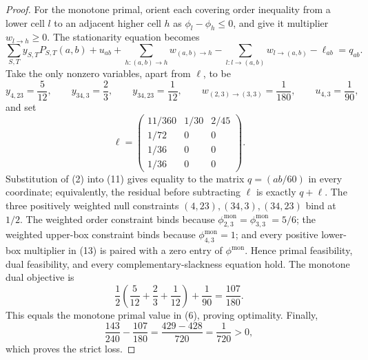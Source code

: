 \documentclass{article}
\begin{document}
\begin{proof}
For the monotone primal, orient each covering order inequality from a lower cell \(l\) to an adjacent higher cell \(h\) as \(\phi_l-\phi_h\leq0\), and give it multiplier \(w_{l\to h}\geq0\). The stationarity equation becomes
\[
 \sum_{S,T}y_{S,T}P_{S,T}(a,b)+u_{ab}
 +\sum_{h:(a,b)\to h}w_{(a,b)\to h}
 -\sum_{l:l\to(a,b)}w_{l\to(a,b)}-\ell_{ab}=q_{ab}. \tag{11}
\]
Take the only nonzero variables, apart from \(\ell\), to be
\[
 y_{4,23}=\frac5{12},\qquad y_{34,3}=\frac23,\qquad
 y_{34,23}=\frac1{12},\qquad
 w_{(2,3)\to(3,3)}=\frac1{180},\qquad
 u_{4,3}=\frac1{90}, \tag{12}
\]
and set
\[
 \ell=\begin{pmatrix}
 11/360&1/30&2/45\\
 1/72&0&0\\
 1/36&0&0\\
 1/36&0&0
 \end{pmatrix}. \tag{13}
\]
Substitution of (2) into (11) gives equality to the matrix \(q=(ab/60)\) in every coordinate; equivalently, the residual before subtracting \(\ell\) is exactly \(q+\ell\). The three positively weighted null constraints \((4,23),(34,3),(34,23)\) bind at \(1/2\). The weighted order constraint binds because \(\phi^{\mathrm{mon}}_{2,3}=\phi^{\mathrm{mon}}_{3,3}=5/6\); the weighted upper-box constraint binds because \(\phi^{\mathrm{mon}}_{4,3}=1\); and every positive lower-box multiplier in (13) is paired with a zero entry of \(\phi^{\mathrm{mon}}\). Hence primal feasibility, dual feasibility, and every complementary-slackness equation hold. The monotone dual objective is
\[
 \frac12\left(\frac5{12}+\frac23+\frac1{12}\right)+\frac1{90}
 =\frac{107}{180}. \tag{14}
\]
This equals the monotone primal value in (6), proving optimality. Finally,
\[
 \frac{143}{240}-\frac{107}{180}
 =\frac{429-428}{720}=\frac1{720}>0,
\]
which proves the strict loss.
\end{proof}
\end{document}
